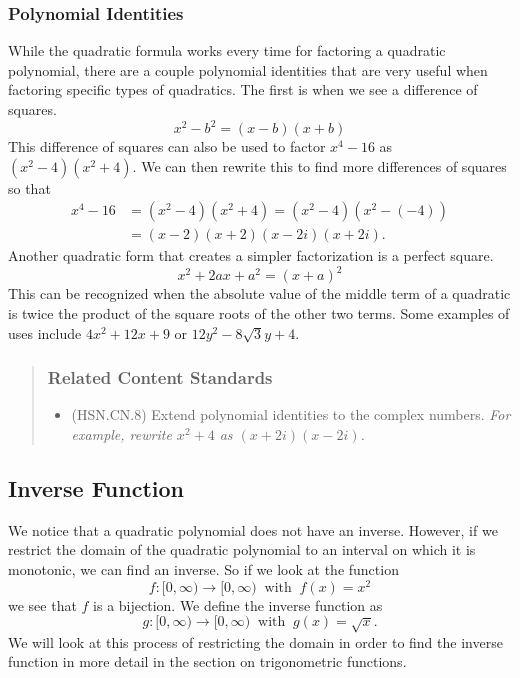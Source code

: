 \documentclass[
]{book}
\providecommand{\tightlist}{%
  \setlength{\itemsep}{0pt}\setlength{\parskip}{0pt}}
\theoremstyle{definition}
\theoremstyle{definition}
\theoremstyle{definition}
\theoremstyle{remark}
\begin{document}
\hypertarget{polynomial-identities}{%
\subsubsection{Polynomial Identities}\label{polynomial-identities}}

While the quadratic formula works every time for factoring a quadratic polynomial, there are a couple polynomial identities that are very useful when factoring specific types of quadratics. The first is when we see a difference of squares.
\[x^2-b^2= (x-b)(x+b)\]
This difference of squares can also be used to factor \(x^4-16\) as \((x^2-4)(x^2+4)\). We can then rewrite this to find more differences of squares so that
\begin{align*}
x^4-16 &= (x^2-4)(x^2+4) = (x^2-4)(x^2- (-4)) \\
&= (x-2)(x+2)(x-2i)(x+2i).
\end{align*}
Another quadratic form that creates a simpler factorization is a perfect square.
\[x^2+2ax+a^2 = (x+a)^2\]
This can be recognized when the absolute value of the middle term of a quadratic is twice the product of the square roots of the other two terms. Some examples of uses include \(4x^2+12x +9\) or \(12y^2-8\sqrt{3} y +4\).

\begin{quote}
\hypertarget{related-content-standards-50}{%
\subsubsection*{Related Content Standards}\label{related-content-standards-50}}

\begin{itemize}
\tightlist
\item
  (HSN.CN.8) Extend polynomial identities to the complex numbers. \textit{For example, rewrite $x^2 + 4$ as $(x + 2i)(x - 2i)$.}
\end{itemize}
\end{quote}

\hypertarget{inverse-function}{%
\subsection{Inverse Function}\label{inverse-function}}

We notice that a quadratic polynomial does not have an inverse. However, if we restrict the domain of the quadratic polynomial to an interval on which it is monotonic, we can find an inverse. So if we look at the function
\[f:[0,\infty) \rightarrow [0,\infty) \: \mbox{ with } \: f(x)=x^2\] we see that \(f\) is a bijection. We define the inverse function as \[g:[0,\infty) \rightarrow [0,\infty) \: \mbox{ with } \: g(x)=\sqrt{x}.\] We will look at this process of restricting the domain in order to find the inverse function in more detail in the section on trigonometric functions.
\end{document}
